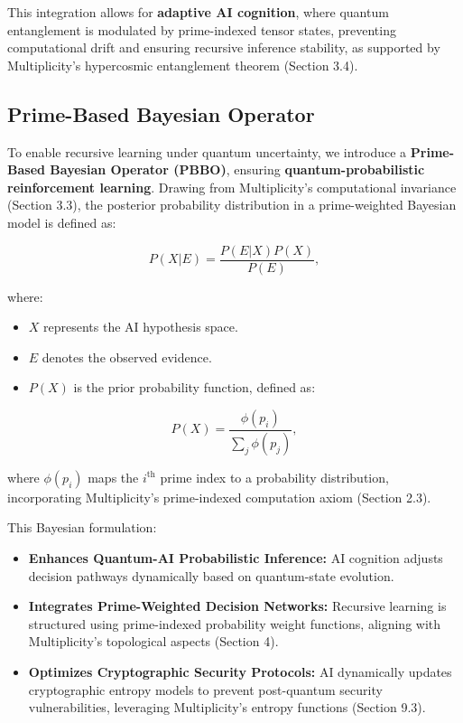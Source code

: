 \documentclass[12pt]{article}
\begin{document}
This integration allows for \textbf{adaptive AI cognition}, where quantum entanglement is modulated by prime-indexed tensor states, preventing computational drift and ensuring recursive inference stability, as supported by Multiplicity’s hypercosmic entanglement theorem (Section 3.4).

\subsection{Prime-Based Bayesian Operator}

To enable recursive learning under quantum uncertainty, we introduce a \textbf{Prime-Based Bayesian Operator (PBBO)}, ensuring \textbf{quantum-probabilistic reinforcement learning}. Drawing from Multiplicity’s computational invariance (Section 3.3), the posterior probability distribution in a prime-weighted Bayesian model is defined as:

\begin{equation}
    P(X | E) = \frac{P(E | X) P(X)}{P(E)},
\end{equation}

where:
\begin{itemize}
    \item \(X\) represents the AI hypothesis space.
    \item \(E\) denotes the observed evidence.
    \item \(P(X)\) is the prior probability function, defined as:
\end{itemize}

\begin{equation}
    P(X) = \frac{\phi(p_i)}{\sum_j \phi(p_j)},
\end{equation}

where \(\phi(p_i)\) maps the \(i^{\text{th}}\) prime index to a probability distribution, incorporating Multiplicity’s prime-indexed computation axiom (Section 2.3).

This Bayesian formulation:
\begin{itemize}
    \item \textbf{Enhances Quantum-AI Probabilistic Inference:} AI cognition adjusts decision pathways dynamically based on quantum-state evolution.
    \item \textbf{Integrates Prime-Weighted Decision Networks:} Recursive learning is structured using prime-indexed probability weight functions, aligning with Multiplicity’s topological aspects (Section 4).
    \item \textbf{Optimizes Cryptographic Security Protocols:} AI dynamically updates cryptographic entropy models to prevent post-quantum security vulnerabilities, leveraging Multiplicity’s entropy functions (Section 9.3).
\end{itemize}
\end{document}
